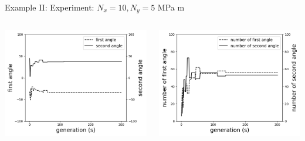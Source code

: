 \documentclass{beamer}
\begin{document}
\begin{frame}{Example II: Experiment: $N_x = 10, N_y=5 $ MPa m}
\begin{columns}
\begin{column}{0.5\textwidth}
        \begin{center}
			\includegraphics[width=1.0\linewidth]{./fig/two_distinct_angle_angle_change.png}
        \end{center}
    \end{column}
    \begin{column}{0.5\textwidth}
        \begin{center}
			\includegraphics[width=1.0\linewidth]{./fig/two_distinct_angler_number_change.png}
        \end{center}
    \end{column}
\end{columns}
\end{frame}
\end{document}
